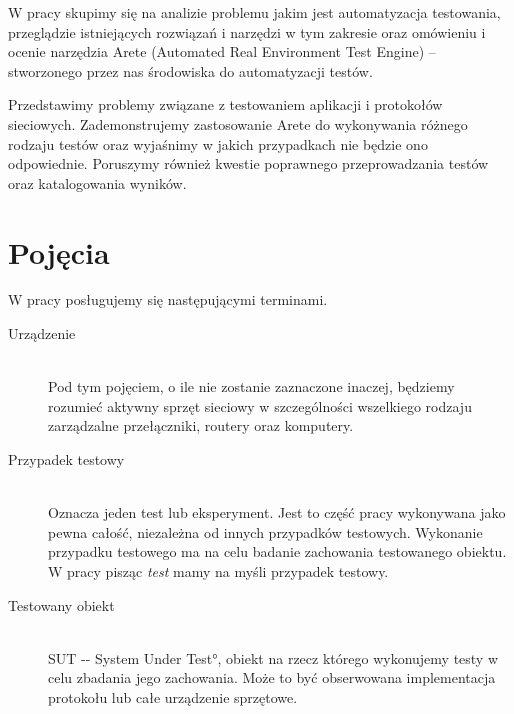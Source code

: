 \documentclass[00-praca-magisterska.tex]{subfiles}
\begin{document}
W pracy skupimy się na analizie problemu jakim jest automatyzacja
testowania, przeglądzie istniejących rozwiązań i narzędzi w tym zakresie oraz
omówieniu i ocenie narzędzia Arete (Automated Real Environment Test Engine) --
stworzonego przez nas środowiska do automatyzacji testów.

Przedstawimy problemy związane z testowaniem aplikacji i protokołów sieciowych.
Zademonstrujemy zastosowanie Arete do wykonywania różnego rodzaju testów oraz
wyjaśnimy w jakich przypadkach nie będzie ono odpowiednie. Poruszymy również
kwestie poprawnego przeprowadzania testów oraz katalogowania wyników.

\section{Pojęcia}
\label{pojecia}

W pracy posługujemy się następującymi terminami. 

\begin{description}
  \item[Urządzenie] \hfill \\
Pod tym pojęciem, o ile nie zostanie zaznaczone inaczej, będziemy rozumieć
aktywny sprzęt sieciowy w szczególności wszelkiego rodzaju zarządzalne
przełączniki, routery oraz komputery.
  \item[Przypadek testowy] \hfill \\
Oznacza jeden test lub eksperyment. Jest to część pracy wykonywana jako pewna
całość, niezależna od innych przypadków testowych. Wykonanie przypadku
testowego ma na celu badanie zachowania testowanego obiektu. W pracy pisząc
\emph{test} mamy na myśli przypadek testowy.
  \item[Testowany obiekt] \hfill \\
\ang{SUT -- System Under Test}, obiekt na rzecz którego wykonujemy testy w celu
zbadania jego zachowania. Może to być obserwowana implementacja protokołu lub
całe urządzenie sprzętowe.
\end{description}
\end{document}

